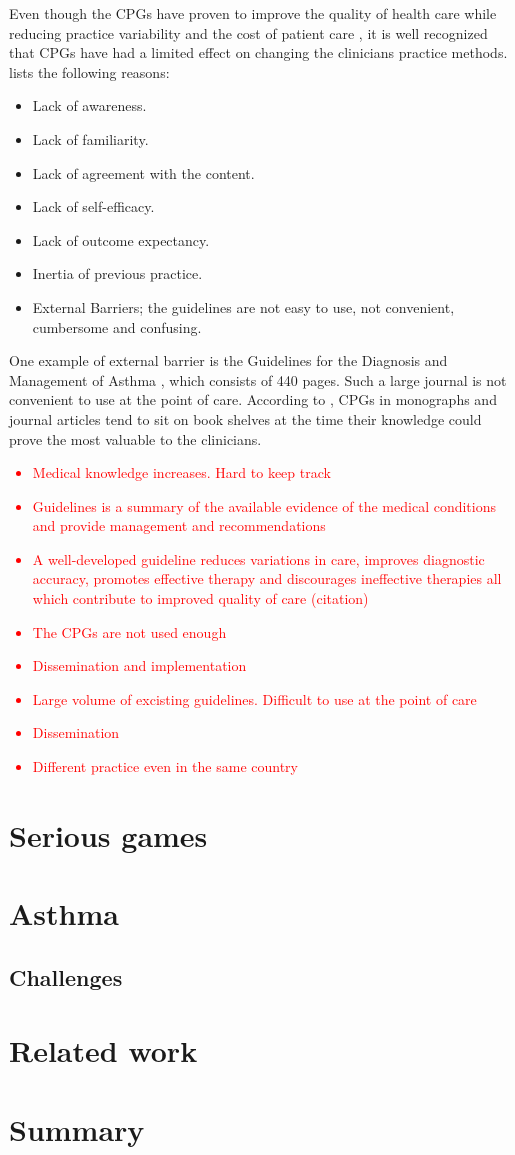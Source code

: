Even though the CPGs have proven to improve the quality of health care while reducing practice variability and the cost of patient care \parencite{DeClercq2008}, it is well recognized that CPGs have had a limited effect on changing the clinicians practice methods. \textcite{Cabana1999} lists the following reasons:
\begin{itemize}
	\item Lack of awareness.
	\item Lack of familiarity.
	\item Lack of agreement with the content.
	\item Lack of self-efficacy.
	\item Lack of outcome expectancy.
	\item Inertia of previous practice. 
	\item External Barriers; the guidelines are not easy to use, not convenient, cumbersome and confusing.
\end{itemize}One example of external barrier is the Guidelines for the Diagnosis and Management of Asthma \parencite{NationalHeartLungandBloodInstitute2007}, which consists of 440 pages. Such a large journal is not convenient to use at the point of care. According to \textcite{Shortliffe1998}, CPGs in monographs and journal articles tend to sit on book shelves at the time their knowledge could prove the most valuable to the clinicians. 




\textcolor{red}{\begin{itemize}
	\item Medical knowledge increases. Hard to keep track
	\item Guidelines is a summary of the available evidence of the medical conditions and provide management and recommendations
	\item A well-developed guideline reduces
	variations in care, improves diagnostic accuracy,
	promotes effective therapy and discourages ineffective
	therapies all which contribute to improved
	quality of care (citation)
	\item The CPGs are not used enough
	\item Dissemination and implementation
	\item Large volume of excisting guidelines. Difficult to use at the point of care
	\item Dissemination
	\item Different practice even in the same country
\end{itemize}}
\section{Serious games}
\section{Asthma}
\subsection{Challenges}
\section{Related work}
\section{Summary}